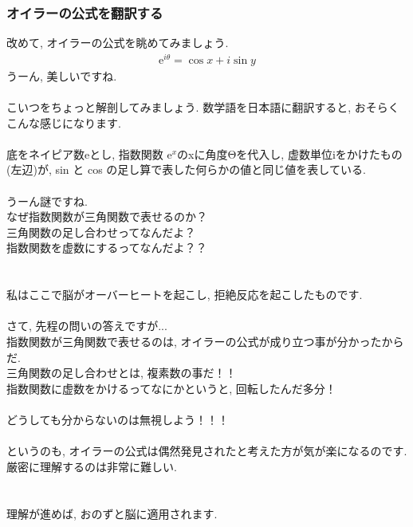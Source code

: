 \documentclass[11pt,a4paper]{jsarticle}
\begin{document}
\subsubsection{オイラーの公式を翻訳する}
改めて, オイラーの公式を眺めてみましょう.\\
\begin{eqnarray}
\mathrm{e}^{i\theta} = \cos x + i\sin y
\end{eqnarray}
うーん, 美しいですね.\\
\\
こいつをちょっと解剖してみましょう. 数学語を日本語に翻訳すると, おそらくこんな感じになります.
\\
\\
底をネイピア数eとし, 指数関数 $\mathrm{e}^x$のxに角度Θを代入し, 虚数単位iをかけたもの(左辺)が, sin と cos の足し算で表した何らかの値と同じ値を表している.\\
\\
うーん謎ですね.\\
なぜ指数関数が三角関数で表せるのか？\\
三角関数の足し合わせってなんだよ？\\
指数関数を虚数にするってなんだよ？？\\
\\
\\
私はここで脳がオーバーヒートを起こし, 拒絶反応を起こしたものです.\\
\\
さて, 先程の問いの答えですが...\\
指数関数が三角関数で表せるのは, オイラーの公式が成り立つ事が分かったからだ.\\
三角関数の足し合わせとは, 複素数の事だ！！\\
指数関数に虚数をかけるってなにかというと, 回転したんだ多分！\\
\\
どうしても分からないのは無視しよう！！！\\
\\
というのも, オイラーの公式は偶然発見されたと考えた方が気が楽になるのです. 厳密に理解するのは非常に難しい.\\
\\
\\
理解が進めば, おのずと脳に適用されます.
\end{document}
